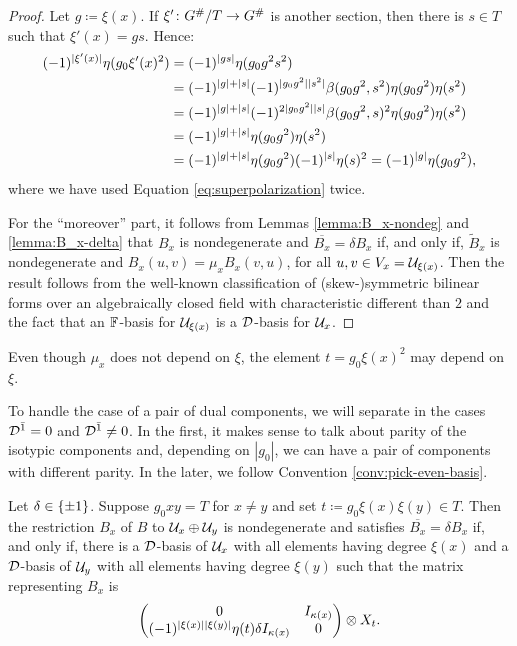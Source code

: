 \begin{proof}
    Let $g \coloneqq \xi(x)$. If $\xi' \colon G^\#/T \to G^\#$ is another section, then there is $s \in T$ such that $\xi' (x) = g s$. 
    Hence:
    \begin{align*}
        (-1)^{|\xi' (x)|} \eta(g_0 \xi' (x)^2) &= (-1)^{|gs|} \eta(g_0 g^2 s^2)\\
        &= (-1)^{|g| + |s|} (-1)^{|g_0 g^2||s^2|} \beta(g_0 g^2, s^2)\eta(g_0 g^2) \eta(s^2)\\
        &= (-1)^{|g| + |s|} (-1)^{2 |g_0 g^2| |s|} \beta(g_0 g^2, s)^2 \eta(g_0 g^2) \eta(s^2) \\
        &= (-1)^{|g| + |s|} \eta(g_0 g^2) \eta(s^2) \\ 
        &= (-1)^{|g| + |s|} \eta(g_0 g^2) (-1)^{|s|} \eta (s)^2 = (-1)^{|g|} \eta(g_0 g^2),
    \end{align*}
    where we have used Equation \eqref{eq:superpolarization} twice. 
    
    For the ``moreover'' part, it follows from Lemmas \ref{lemma:B_x-nondeg} and \ref{lemma:B_x-delta} that $B_x$ is nondegenerate and $\overline{B_x} = \delta B_x$ if, and only if, $\tilde B_x$ is nondegenerate and $B_x (u,v) = \mu_x B_x(v, u)$, for all $u,v \in V_x = \mathcal U_{\xi(x)}$. 
    Then the result follows from the well-known classification of (skew-)symmetric bilinear forms over an algebraically closed field with characteristic different than $2$ and the fact that an $\mathbb{F}$-basis for $\mathcal U_{\xi(x)}$ is a $\mathcal{D}$-basis for $\mathcal U_x$.
\end{proof}

\begin{remark}
    Even though $\mu_{x}$ does not depend on $\xi$, the element $t = g_0\xi(x)^2$ may depend on $\xi$.
\end{remark}

To handle the case of a pair of dual components, we will separate in the cases $\mathcal{D}^{\bar1} = 0$ and $\mathcal{D}^{\bar1} \neq 0$. 
In the first, it makes sense to talk about parity of the isotypic components and, depending on $|g_0|$, we can have a pair of components with different parity. 
In the later, we follow Convention \ref{conv:pick-even-basis}.  

\begin{prop}\label{prop:pair-of-dual-components}
    Let $\delta \in \{ \pm 1 \}$. 
    Suppose $g_0 x y = T$ for $x\neq y$ and set $t \coloneqq g_0\xi(x)\xi(y) \in T$. 
    Then the restriction $B_x$ of $B$ to $\mathcal U_x \oplus \mathcal U_y$ is nondegenerate and satisfies $\overline{B_x} = \delta B_x$ if, and only if, there is a $\mathcal{D}$-basis of $\mathcal U_x$ with all elements having degree $\xi(x)$ and a $\mathcal{D}$-basis of $\mathcal U_y$ with all elements having degree $\xi(y)$ such that the matrix representing $B_x$ is
    \[
        \begin{pmatrix}
            0 & I_{\kappa(x)}\\
            (-1)^{|\xi(x)||\xi(y)|} \eta(t) \delta I_{\kappa(x)} & 0
        \end{pmatrix} \otimes X_t. 
    \]
\end{prop}

